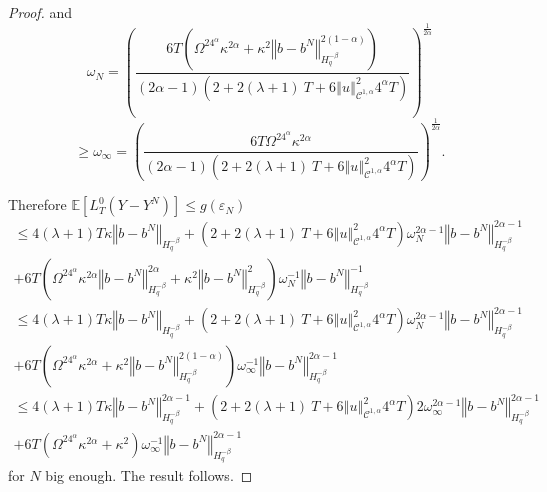 \documentclass[11pt]{article}
\newcommand{\norme}[1]{\left\Vert #1\right\Vert}
\newcommand{\E}{\mathbb{E}}
\begin{document}
\begin{proof}
    and \begin{equation*}
    \omega_N = \left(\frac{6T\left(\Omega^24^{\alpha}\kappa^{2\alpha} +\kappa^2\norme{b-b^N}_{H^{-\beta}_{q}}^{2(1-\alpha)}\right)}{(2\alpha-1)\left(2 + 2(\lambda + 1)\ T + 6\norme{u}_{\mathcal{C}^{1,\alpha}}^2 4^{\alpha}T\right)}\right)^{\frac{1}{2\alpha}}
    \end{equation*}
    \begin{equation*}
    \geq\omega_\infty=\left(\frac{6T\Omega^24^{\alpha}\kappa^{2\alpha} }{(2\alpha-1)\left(2 + 2(\lambda + 1)\ T + 6\norme{u}_{\mathcal{C}^{1,\alpha}}^2 4^{\alpha}T\right)}\right)^{\frac{1}{2\alpha}}.
    \end{equation*}
    
    Therefore $
    \E\left[L^0_T(Y-Y^N)\right]\leq g(\varepsilon_N)
    $
    \begin{multline*}
    \leq 4(\lambda + 1)T\kappa\norme{b-b^N}_{H^{-\beta}_{q}} + \left(2 + 2(\lambda + 1)\ T + 6\norme{u}_{\mathcal{C}^{1,\alpha}}^2 4^{\alpha}T\right) \omega_N^{2\alpha-1}\norme{b-b^N}_{H^{-\beta}_{q}}^{2\alpha-1} \\ + 6T\left(\Omega^24^{\alpha}\kappa^{2\alpha} \norme{b-b^N}_{H^{-\beta}_q}^{2\alpha}+\kappa^2\norme{b-b^N}_{H^{-\beta}_{q}}^2\right)\omega_N^{-1}\norme{b-b^N}_{H^{-\beta}_{q}}^{-1}
    \end{multline*} 
    \begin{multline*}
    \leq 4(\lambda + 1)T\kappa\norme{b-b^N}_{H^{-\beta}_{q}} + \left(2 + 2(\lambda + 1)\ T + 6\norme{u}_{\mathcal{C}^{1,\alpha}}^2 4^{\alpha}T\right) \omega_N^{2\alpha-1}\norme{b-b^N}_{H^{-\beta}_{q}}^{2\alpha-1} \\ + 6T\left(\Omega^24^{\alpha}\kappa^{2\alpha} +\kappa^2\norme{b-b^N}_{H^{-\beta}_{q}}^{2(1-\alpha)}\right)\omega_\infty^{-1}\norme{b-b^N}_{H^{-\beta}_{q}}^{2\alpha-1}
    \end{multline*}   
    \begin{multline*}
    \leq 4(\lambda + 1)T\kappa\norme{b-b^N}_{H^{-\beta}_{q}}^{2\alpha-1} + \left(2 + 2(\lambda + 1)\ T + 6\norme{u}_{\mathcal{C}^{1,\alpha}}^2 4^{\alpha}T\right)2 \omega_\infty^{2\alpha-1}\norme{b-b^N}_{H^{-\beta}_{q}}^{2\alpha-1} \\ + 6T\left(\Omega^24^{\alpha}\kappa^{2\alpha} +\kappa^2\right)\omega_\infty^{-1}\norme{b-b^N}_{H^{-\beta}_{q}}^{2\alpha-1}
    \end{multline*}
    for $N$ big enough. The result follows.
\end{proof}
\end{document}
